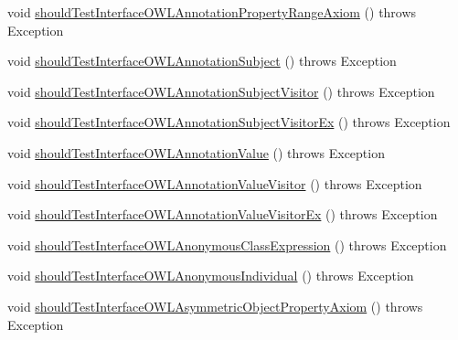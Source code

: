 \begin{DoxyCompactItemize}
\item 
void \hyperlink{classorg_1_1semanticweb_1_1owlapi_1_1contract_1_1_contract_owlapi_model__1_test_ae6f4a4e152e820b7c22e2a17606e26b1}{should\-Test\-Interface\-O\-W\-L\-Annotation\-Property\-Range\-Axiom} ()  throws Exception 
\item 
void \hyperlink{classorg_1_1semanticweb_1_1owlapi_1_1contract_1_1_contract_owlapi_model__1_test_ae4f0efeb7c2e80476547b85214691c56}{should\-Test\-Interface\-O\-W\-L\-Annotation\-Subject} ()  throws Exception 
\item 
void \hyperlink{classorg_1_1semanticweb_1_1owlapi_1_1contract_1_1_contract_owlapi_model__1_test_a122b72c0afbc44832aca5c824b36ba95}{should\-Test\-Interface\-O\-W\-L\-Annotation\-Subject\-Visitor} ()  throws Exception 
\item 
void \hyperlink{classorg_1_1semanticweb_1_1owlapi_1_1contract_1_1_contract_owlapi_model__1_test_a811633285647608272411dc6b8835ac0}{should\-Test\-Interface\-O\-W\-L\-Annotation\-Subject\-Visitor\-Ex} ()  throws Exception 
\item 
void \hyperlink{classorg_1_1semanticweb_1_1owlapi_1_1contract_1_1_contract_owlapi_model__1_test_a3cbc0b6f4bb39e7a537668cdb8be509b}{should\-Test\-Interface\-O\-W\-L\-Annotation\-Value} ()  throws Exception 
\item 
void \hyperlink{classorg_1_1semanticweb_1_1owlapi_1_1contract_1_1_contract_owlapi_model__1_test_afa09d14d1e90336848b46e06a7ac3e5f}{should\-Test\-Interface\-O\-W\-L\-Annotation\-Value\-Visitor} ()  throws Exception 
\item 
void \hyperlink{classorg_1_1semanticweb_1_1owlapi_1_1contract_1_1_contract_owlapi_model__1_test_a3099473fa08876a8574d78ecfdad4049}{should\-Test\-Interface\-O\-W\-L\-Annotation\-Value\-Visitor\-Ex} ()  throws Exception 
\item 
void \hyperlink{classorg_1_1semanticweb_1_1owlapi_1_1contract_1_1_contract_owlapi_model__1_test_a63991056802fd9fbce435b369ecdb9a9}{should\-Test\-Interface\-O\-W\-L\-Anonymous\-Class\-Expression} ()  throws Exception 
\item 
void \hyperlink{classorg_1_1semanticweb_1_1owlapi_1_1contract_1_1_contract_owlapi_model__1_test_ab13201694e19e539b658b13935c24ea2}{should\-Test\-Interface\-O\-W\-L\-Anonymous\-Individual} ()  throws Exception 
\item 
void \hyperlink{classorg_1_1semanticweb_1_1owlapi_1_1contract_1_1_contract_owlapi_model__1_test_a4581390e5b299a8c3034f2a7615ed399}{should\-Test\-Interface\-O\-W\-L\-Asymmetric\-Object\-Property\-Axiom} ()  throws Exception 

\end{DoxyCompactItemize}
